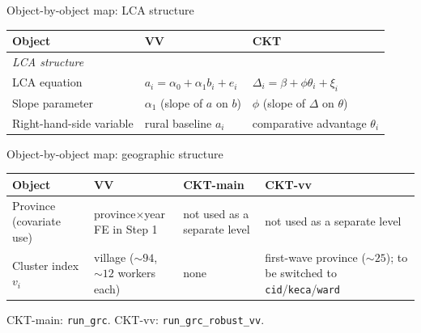 \documentclass[10pt,aspectratio=169]{beamer}
\newcommand{\thetai}{\theta_{i}}
\newcommand{\Deltai}{\Delta_{i}}
\newcommand{\phicoef}{\phi}
\newcommand{\vii}{v_{i}}
\begin{document}
\begin{frame}{Object-by-object map: LCA structure}

  \begin{center}
  \begin{tabular}{p{4.0cm}p{4.5cm}p{4.5cm}}
    \toprule
    Object & VV & CKT \\
    \midrule
    \multicolumn{3}{l}{\emph{LCA structure}} \\
    LCA equation                       & $a_i = \alpha_0 + \alpha_1 b_i + e_i$  & $\Deltai = \beta + \phicoef\thetai + \xi_i$ \\
    Slope parameter                    & $\alpha_1$ (slope of $a$ on $b$)       & $\phicoef$ (slope of $\Delta$ on $\theta$) \\
    Right-hand-side variable           & rural baseline $a_i$                  & comparative advantage $\thetai$ \\
    \bottomrule
  \end{tabular}
  \end{center}

\end{frame}

\begin{frame}{Object-by-object map: geographic structure}

  \begin{center}
  \begin{tabular}{p{3.2cm}p{3.5cm}p{2.5cm}p{3.1cm}}
    \toprule
    Object & VV & CKT-main & CKT-vv \\
    \midrule
    Province (covariate use)
      & province$\times$year FE in Step 1
      & not used as a separate level
      & not used as a separate level \\
    Cluster index $\vii$
      & village (${\sim}94$, ${\sim}12$ workers each)
      & none
      & first-wave province (${\sim}25$); to be switched to \texttt{cid}/\texttt{keca}/\texttt{ward} \\
    \bottomrule
  \end{tabular}
  \end{center}

  \vspace{0.4em}
  {\footnotesize CKT-main: \texttt{run\_grc}. \quad CKT-vv: \texttt{run\_grc\_robust\_vv}.}

\end{frame}
\end{document}
